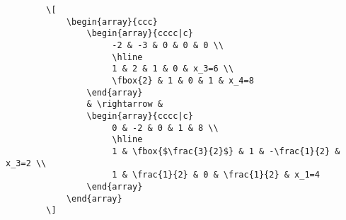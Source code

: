 \documentclass{OR_SolutionTheme}
\begin{document}
\begin{description}
\begin{enumerate}
        \begin{verbatim}
        \[
            \begin{array}{ccc}
                \begin{array}{cccc|c}
                     -2 & -3 & 0 & 0 & 0 \\
                     \hline
                     1 & 2 & 1 & 0 & x_3=6 \\
                     \fbox{2} & 1 & 0 & 1 & x_4=8
                \end{array}
                & \rightarrow &
                \begin{array}{cccc|c}
                     0 & -2 & 0 & 1 & 8 \\
                     \hline
                     1 & \fbox{$\frac{3}{2}$} & 1 & -\frac{1}{2} & x_3=2 \\
                     1 & \frac{1}{2} & 0 & \frac{1}{2} & x_1=4
                \end{array}
            \end{array}
        \]
        \end{verbatim}
    \end{enumerate}

    
    
    
\end{description}
\end{document}
